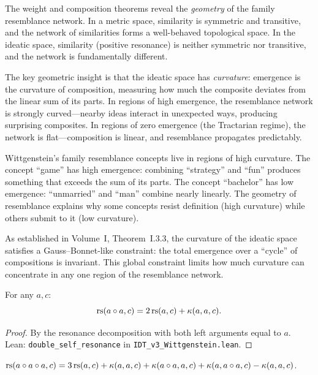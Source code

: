 \begin{interpretation}
The weight and composition theorems reveal the \emph{geometry} of the family
resemblance network. In a metric space, similarity is symmetric and transitive,
and the network of similarities forms a well-behaved topological space. In the
ideatic space, similarity (positive resonance) is neither symmetric nor
transitive, and the network is fundamentally different.

The key geometric insight is that the ideatic space has \emph{curvature}:
emergence is the curvature of composition, measuring how much the composite
deviates from the linear sum of its parts. In regions of high emergence,
the resemblance network is strongly curved---nearby ideas interact in
unexpected ways, producing surprising composites. In regions of zero emergence
(the Tractarian regime), the network is flat---composition is linear, and
resemblance propagates predictably.

Wittgenstein's family resemblance concepts live in regions of high curvature.
The concept ``game'' has high emergence: combining ``strategy'' and ``fun''
produces something that exceeds the sum of its parts. The concept ``bachelor''
has low emergence: ``unmarried'' and ``man'' combine nearly linearly. The
geometry of resemblance explains why some concepts resist definition (high
curvature) while others submit to it (low curvature).

As established in Volume~I, Theorem~I.3.3, the curvature of the ideatic
space satisfies a Gauss--Bonnet-like constraint: the total emergence over
a ``cycle'' of compositions is invariant. This global constraint limits
how much curvature can concentrate in any one region of the resemblance
network.
\end{interpretation}

\begin{theorem}
\label{thm:double-self-resonance}
For any $a, c$:
\[
\mathrm{rs}(a \circ a, c) = 2\,\mathrm{rs}(a, c) + \kappa(a, a, c).
\]
\end{theorem}

\begin{proof}
By the resonance decomposition with both left arguments equal to $a$.
Lean: \texttt{double\_self\_resonance} in \texttt{IDT\_v3\_Wittgenstein.lean}.
\end{proof}

\begin{theorem}
\label{thm:triple-self-resonance}
$\mathrm{rs}(a \circ a \circ a, c) = 3\,\mathrm{rs}(a, c) + \kappa(a, a, c)
+ \kappa(a \circ a, a, c) + \kappa(a, a \circ a, c) - \kappa(a, a, c)$.
\end{theorem}

